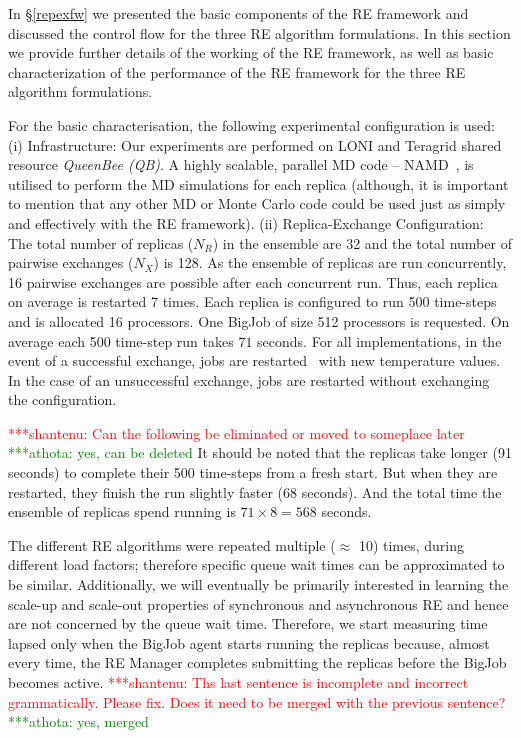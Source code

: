 \documentclass{rspublic}
\newcommand{\jhanote}[1]{ {\textcolor{red} { ***shantenu: #1 }}}
\newcommand{\athotanote}[1]{ {\textcolor{green} { ***athota: #1 }}}
\newcommand{\athotanote}[1]{}
\newcommand{\jhanote}[1]{}
\begin{document}
In \S\ref{repexfw} we presented the basic components of the RE
framework and discussed the control flow for the three RE algorithm
formulations.  In this section we provide further details of the
working of the RE framework, as well as basic characterization of the
performance of the RE framework for the three RE algorithm formulations.


For the basic characterisation, the following experimental
configuration is used: (i) Infrastructure: Our experiments are
performed on LONI and Teragrid shared resource \emph{QueenBee (QB)}. A
highly scalable, parallel MD code -- NAMD~\citep{Phillips:2005gd}, is
utilised to perform the MD simulations for each replica (although, it
is important to mention that any other MD or Monte Carlo code could be
used just as simply and effectively with the RE framework).  (ii)
Replica-Exchange Configuration: The total number of replicas ($N_R$)
in the ensemble are 32 and the total number of pairwise exchanges
($N_X$) is 128. As the ensemble of replicas are run concurrently, 16
pairwise exchanges are possible after each concurrent run. Thus, each
replica on average is restarted 7 times.  Each replica is configured
to run 500 time-steps and is allocated 16 processors. One BigJob of size 512 processors is requested. On average each
500 time-step run takes $71$ seconds.  For all implementations, in the
event of a successful exchange, jobs are
restarted~\citep{Luckow:2008fp} with new temperature values.  In the
case of an unsuccessful exchange, jobs are restarted without
exchanging the configuration.

\jhanote{Can the following be eliminated or moved to someplace later} \athotanote{yes, can be deleted}
It should be noted that the replicas take longer (91 seconds) to
complete their 500 time-steps from a fresh start. But when they are
restarted, they finish the run slightly faster (68 seconds).  And the
total time the ensemble of replicas spend running is $71 \times 8 =
568$ seconds.

The different RE algorithms were repeated multiple ($\approx$ 10)
times, during different load factors; therefore specific queue wait
times can be approximated to be similar.  Additionally, we will
eventually be primarily interested in learning the scale-up and
scale-out properties of synchronous and asynchronous RE and hence are
not concerned by the queue wait time. Therefore, we start measuring
time lapsed only when the BigJob agent starts running the
replicas because, almost every time, the RE Manager
completes submitting the replicas before the BigJob becomes active.
\jhanote{Ths last sentence is incomplete and incorrect
  grammatically. Please fix. Does it need to be merged with the
  previous sentence?} \athotanote{yes, merged}
\end{document}
